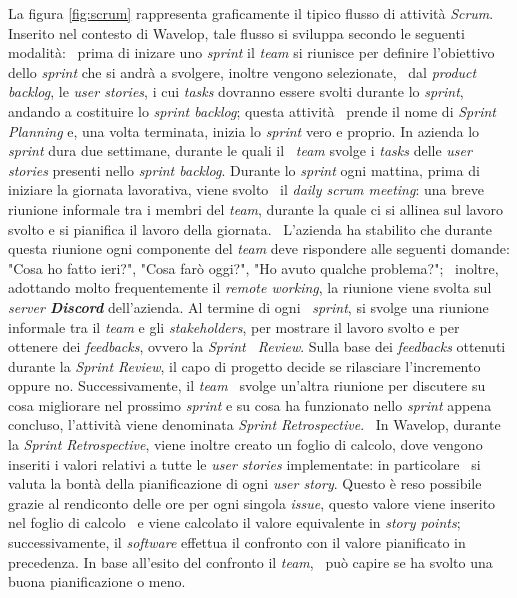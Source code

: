 La figura \ref{fig:scrum} rappresenta graficamente il tipico flusso di attività \emph{Scrum}. Inserito nel contesto di Wavelop, tale flusso si sviluppa secondo le seguenti modalità: \
prima di inizare uno \emph{sprint} il \emph{team} si riunisce per definire l'obiettivo dello \emph{sprint} che si andrà a svolgere, inoltre vengono selezionate, \
dal \emph{product backlog}, le \emph{user stories}, i cui \emph{tasks} dovranno essere svolti durante lo \emph{sprint}, andando a costituire lo \emph{sprint backlog}; questa attività \
prende il nome di \emph{Sprint Planning} e, una volta terminata, inizia lo \emph{sprint} vero e proprio. In azienda lo \emph{sprint} dura due settimane, durante le quali il \
\emph{team} svolge i \emph{tasks} delle \emph{user stories} presenti nello \emph{sprint backlog}. Durante lo \emph{sprint} ogni mattina, prima di iniziare la giornata lavorativa, viene svolto \
il \emph{daily scrum meeting}: una breve riunione informale tra i membri del \emph{team}, durante la quale ci si allinea sul lavoro svolto e si pianifica il lavoro della giornata. \
L'azienda ha stabilito che durante questa riunione ogni componente del \emph{team} deve rispondere alle seguenti domande: "Cosa ho fatto ieri?", "Cosa farò oggi?", "Ho avuto qualche problema?"; \
inoltre, adottando molto frequentemente il \emph{remote working}, la riunione viene svolta sul \emph{server \textbf{Discord}} dell'azienda. Al termine di ogni \
\emph{sprint}, si svolge una riunione informale tra il \emph{team} e gli \emph{\glspl{stakeholder}}, per mostrare il lavoro svolto e per ottenere dei \emph{feedbacks}, ovvero la \emph{Sprint \
Review}. Sulla base dei \emph{feedbacks} ottenuti durante la \emph{Sprint Review}, il capo di progetto decide se rilasciare l'incremento oppure no. Successivamente, il \emph{team} \
svolge un'altra riunione per discutere su cosa migliorare nel prossimo \emph{sprint} e su cosa ha funzionato nello \emph{sprint} appena concluso, l'attività viene denominata \emph{Sprint Retrospective}. \
In Wavelop, durante la \emph{Sprint Retrospective}, viene inoltre creato un foglio di calcolo, dove vengono inseriti i valori relativi a tutte le \emph{user stories} implementate: in particolare \
si valuta la bontà della pianificazione di ogni \emph{user story}. Questo è reso possibile grazie al rendiconto delle ore per ogni singola \emph{issue}, questo valore viene inserito nel foglio di calcolo \
e viene calcolato il valore equivalente in \emph{story points}; successivamente, il \emph{software} effettua il confronto con il valore pianificato in precedenza. In base all'esito del confronto il \emph{team}, \
può capire se ha svolto una buona pianificazione o meno.

